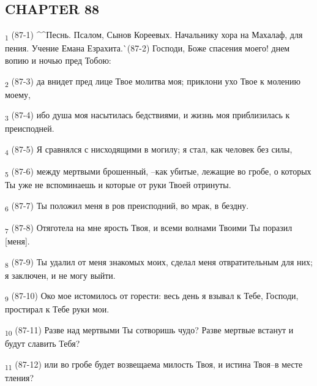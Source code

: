 \subsection{CHAPTER 88}
\begin{tcolorbox}
\textsubscript{1} (87-1) ^^Песнь. Псалом, Сынов Кореевых. Начальнику хора на Махалаф, для пения. Учение Емана Езрахита.^^ (87-2) Господи, Боже спасения моего! днем вопию и ночью пред Тобою:
\end{tcolorbox}
\begin{tcolorbox}
\textsubscript{2} (87-3) да внидет пред лице Твое молитва моя; приклони ухо Твое к молению моему,
\end{tcolorbox}
\begin{tcolorbox}
\textsubscript{3} (87-4) ибо душа моя насытилась бедствиями, и жизнь моя приблизилась к преисподней.
\end{tcolorbox}
\begin{tcolorbox}
\textsubscript{4} (87-5) Я сравнялся с нисходящими в могилу; я стал, как человек без силы,
\end{tcolorbox}
\begin{tcolorbox}
\textsubscript{5} (87-6) между мертвыми брошенный, --как убитые, лежащие во гробе, о которых Ты уже не вспоминаешь и которые от руки Твоей отринуты.
\end{tcolorbox}
\begin{tcolorbox}
\textsubscript{6} (87-7) Ты положил меня в ров преисподний, во мрак, в бездну.
\end{tcolorbox}
\begin{tcolorbox}
\textsubscript{7} (87-8) Отяготела на мне ярость Твоя, и всеми волнами Твоими Ты поразил [меня].
\end{tcolorbox}
\begin{tcolorbox}
\textsubscript{8} (87-9) Ты удалил от меня знакомых моих, сделал меня отвратительным для них; я заключен, и не могу выйти.
\end{tcolorbox}
\begin{tcolorbox}
\textsubscript{9} (87-10) Око мое истомилось от горести: весь день я взывал к Тебе, Господи, простирал к Тебе руки мои.
\end{tcolorbox}
\begin{tcolorbox}
\textsubscript{10} (87-11) Разве над мертвыми Ты сотворишь чудо? Разве мертвые встанут и будут славить Тебя?
\end{tcolorbox}
\begin{tcolorbox}
\textsubscript{11} (87-12) или во гробе будет возвещаема милость Твоя, и истина Твоя--в месте тления?
\end{tcolorbox}
